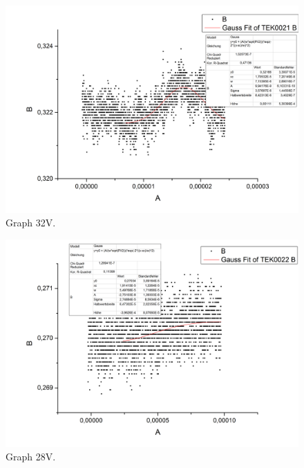 \begin{figure}[h]
\begin{center}
\includegraphics[scale=0.25]{Bilder/Teil2/25}
\caption{Graph 32V.}
\label{fig:25}
\end{center}
\end{figure}
\begin{figure}[h]
\begin{center}
\includegraphics[scale=0.25]{Bilder/Teil2/26}
\caption{Graph 28V.}
\label{fig:26}
\end{center}
\end{figure}